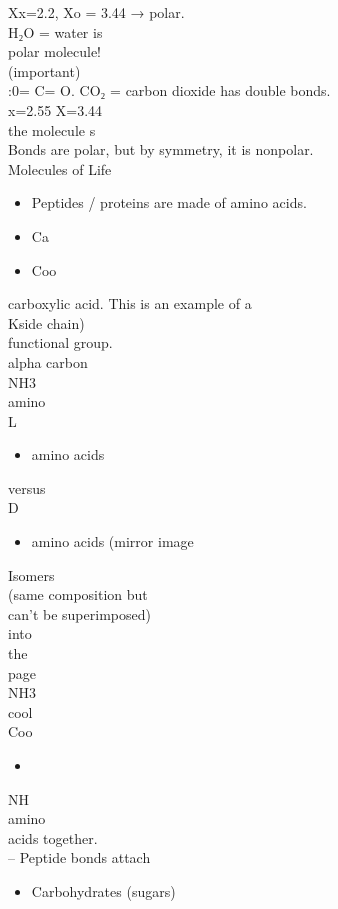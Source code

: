 \documentclass{article}
\begin{document}
Xx=2.2, Xo = 3.44 → polar.\\
H₂O = water is\\
polar molecule!\\
(important)\\
:0= C= O. CO₂ = carbon dioxide has double bonds.\\
x=2.55 X=3.44\\
the molecule s\\
Bonds are polar, but by symmetry, it is nonpolar.\\
Molecules of Life\\
\begin{itemize}\item  Peptides / proteins are made of amino acids.
\item Ca \item  Coo\end{itemize}
carboxylic acid. This is an example of a\\
Kside chain)\\
functional group.\\
alpha carbon\\
NH3\\
amino\\
L\begin{itemize}\item amino acids
\end{itemize}
versus\\
D\begin{itemize}\item amino acids (mirror image
\end{itemize}
Isomers\\
(same composition but\\
can't be superimposed)\\
into\\
the\\
page\\
NH3\\
cool\\
Coo\begin{itemize}\item 
\end{itemize}
NH\\
amino\\
acids together.\\
– Peptide bonds attach\\
\begin{itemize}\item  Carbohydrates (sugars)
\end{itemize}
\end{document}
